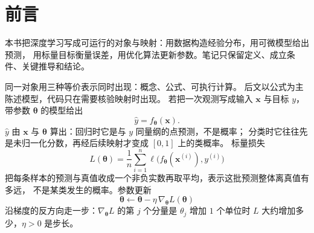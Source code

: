 \chapter*{前言}

本书把深度学习写成可运行的对象与映射：用数据构造经验分布，用可微模型给出预测，
用标量目标衡量误差，用优化算法更新参数。笔记只保留定义、成立条件、关键推导和结论。

同一对象用三种等价表示同时出现：概念、公式、可执行计算。
后文以公式为主陈述模型，代码只在需要核验映射时出现。
若把一次观测写成输入 $\bm{x}$ 与目标 $y$，带参数 $\bm{\theta}$ 的模型给出
\[
\hat{y}=f_{\bm{\theta}}(\bm{x}).
\]
$\hat{y}$ 由 $\bm{x}$ 与 $\bm{\theta}$ 算出：回归时它是与 $y$ 同量纲的点预测，不是概率；
分类时它往往先是未归一化分数，再经后续映射才变成 $[0,1]$ 上的类概率。
标量损失
\[
L(\bm{\theta})
=
\frac{1}{n}\sum_{i=1}^{n}
\ell\bigl(f_{\bm{\theta}}(\bm{x}^{(i)}),y^{(i)}\bigr)
\]
把每条样本的预测与真值收成一个非负实数再取平均，表示这批预测整体离真值有多远，
不是某类发生的概率。参数更新
\[
\bm{\theta}
\leftarrow
\bm{\theta}-\eta\,\nabla_{\bm{\theta}}L(\bm{\theta})
\]
沿梯度的反方向走一步：$\nabla_{\bm{\theta}}L$ 的第 $j$ 个分量是 $\theta_j$ 增加 $1$ 个单位时
$L$ 大约增加多少，$\eta>0$ 是步长。
